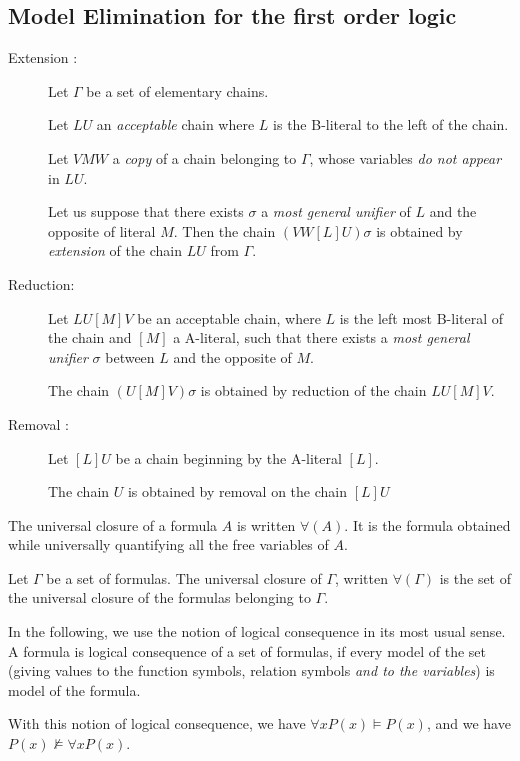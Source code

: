 \documentclass{article}
\begin{document}
\subsection{Model Elimination for the first order logic}

\begin{description}
\item [Extension :]
Let $\Gamma$ be a set of elementary chains. 

Let $L U$ an \emph{acceptable} chain where $L$ is the B-literal to the left of the chain.

Let $V M W$ a \emph{copy} of a chain belonging to $\Gamma$, whose variables  \emph{do not appear}
in $L U$.  

Let us suppose that there exists $\sigma$ a \emph{most general unifier} of $L$ and the opposite of literal $M$. 
Then the chain  $(VW[L]U)\sigma$ is obtained by \emph{extension} of the chain $LU$ from  $\Gamma$.


\item [Reduction:]
Let $L U [M] V$ be an acceptable chain, where $L$ is the left most B-literal of the chain and $[M]$ a A-literal,
such that there exists a \emph{most general unifier} $\sigma$ between $L$ and the opposite of $M$.

The chain $(U [M]V)\sigma$ is obtained by reduction of the chain $L U [M]V$.

\item [Removal :]
Let $[L] U$ be a chain beginning by the A-literal $[L]$.

The chain $U$ is obtained by removal on the chain  $[L]U$

\end{description}


The universal closure of a formula $A$ is written $\forall(A)$. It is the formula obtained while universally quantifying all the
free variables of $A$.

Let $\Gamma$ be a set of formulas. The universal closure of $\Gamma$, written $\forall(\Gamma)$ 
is the set of the universal closure of the formulas belonging to $\Gamma$.

In the following, we use the notion of logical consequence in its most usual sense. A formula is logical consequence of a set
of formulas, if every model of the set (giving values to the function symbols, relation symbols \emph{and to the variables})
is model of the formula.

With this notion of logical consequence, we have 
 $\forall x P(x) \models P(x)$, and we have $P(x) \not\models \forall x P(x)$.
\end{document}
